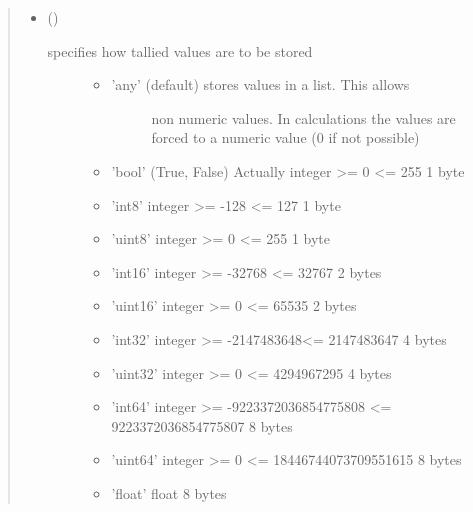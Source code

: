 \documentclass[letterpaper,10pt,english]{sphinxmanual}
\begin{document}
\begin{fulllineitems}
\begin{quote}
\begin{description}
\begin{itemize}
\item {} 
 () \textendash{} \begin{description}
\item[{specifies how tallied values are to be stored}] \leavevmode\begin{itemize}
\item {} \begin{description}
\item[{’any’ (default) stores values in a list. This allows}] \leavevmode
non numeric values. In calculations the values are
forced to a numeric value (0 if not possible)

\end{description}

\item {} 
’bool’ (True, False) Actually integer \textgreater{}= 0 \textless{}= 255 1 byte

\item {} 
’int8’ integer \textgreater{}= -128 \textless{}= 127 1 byte

\item {} 
’uint8’ integer \textgreater{}= 0 \textless{}= 255 1 byte

\item {} 
’int16’ integer \textgreater{}= -32768 \textless{}= 32767 2 bytes

\item {} 
’uint16’ integer \textgreater{}= 0 \textless{}= 65535 2 bytes

\item {} 
’int32’ integer \textgreater{}= -2147483648\textless{}= 2147483647 4 bytes

\item {} 
’uint32’ integer \textgreater{}= 0 \textless{}= 4294967295 4 bytes

\item {} 
’int64’ integer \textgreater{}= -9223372036854775808 \textless{}= 9223372036854775807 8 bytes

\item {} 
’uint64’ integer \textgreater{}= 0 \textless{}= 18446744073709551615 8 bytes

\item {} 
’float’ float 8 bytes

\end{itemize}

\end{description}



\end{itemize}
\end{description}
\end{quote}
\end{fulllineitems}
\end{document}
